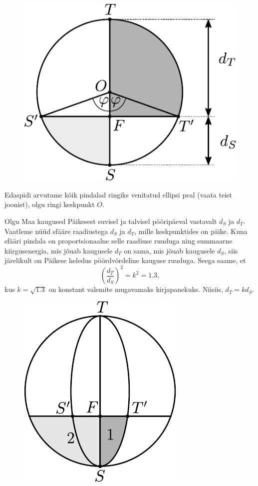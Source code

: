 \begin{figure}[H]
	\centering
	\includegraphics[width=0.4\linewidth]{2020-lahg-09-sol1.pdf}
\end{figure}

Edaspidi arvutame kõik pindalad ringiks venitatud ellipsi peal (vaata teist joonist), olgu ringi keskpunkt $O$.


Olgu Maa kaugused Päikesest suvisel ja talvisel pööripäeval vastavalt $d_S$ ja $d_T$. Vaatleme nüüd sfääre raadiustega $d_S$ ja $d_T$, mille keskpunktides on päike. Kuna sfääri pindala on proportsionaalne selle raadiuse ruuduga ning summaarne kiirgusenergia, mis jõuab kaugusele $d_T$ on sama, mis jõuab kaugusele $d_S$, siis järelikult on Päikese heledus pöördvõrdeline kauguse ruuduga. Seega saame, et
\[
\left(\frac{d_T}{d_S}\right)^2 = k^2 = \num{1.3},
\]
kus $k = \sqrt{\num{1.3}}$ on konstant valemite mugavamaks kirjapanekuks. Niisiis, $d_T = kd_S$.

\begin{figure}[H]
	\centering
	\includegraphics[width=0.6\linewidth]{2020-lahg-09-sol2.pdf}
\end{figure}

